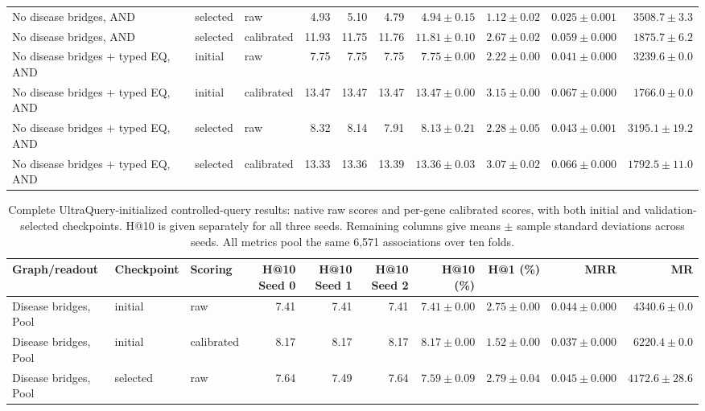 \begin{landscape}
\begin{table}[p]
\begin{adjustbox}{max width=\linewidth}
\begin{tabular}{lllrrrrrrr}
No disease bridges, AND & selected & raw & 4.93 & 5.10 & 4.79 & $4.94\pm 0.15$ & $1.12\pm 0.02$ & $0.025\pm 0.001$ & $3508.7\pm 3.3$ \\
No disease bridges, AND & selected & calibrated & 11.93 & 11.75 & 11.76 & $11.81\pm 0.10$ & $2.67\pm 0.02$ & $0.059\pm 0.000$ & $1875.7\pm 6.2$ \\
No disease bridges + typed EQ, AND & initial & raw & 7.75 & 7.75 & 7.75 & $7.75\pm 0.00$ & $2.22\pm 0.00$ & $0.041\pm 0.000$ & $3239.6\pm 0.0$ \\
No disease bridges + typed EQ, AND & initial & calibrated & 13.47 & 13.47 & 13.47 & $13.47\pm 0.00$ & $3.15\pm 0.00$ & $0.067\pm 0.000$ & $1766.0\pm 0.0$ \\
No disease bridges + typed EQ, AND & selected & raw & 8.32 & 8.14 & 7.91 & $8.13\pm 0.21$ & $2.28\pm 0.05$ & $0.043\pm 0.001$ & $3195.1\pm 19.2$ \\
No disease bridges + typed EQ, AND & selected & calibrated & 13.33 & 13.36 & 13.39 & $13.36\pm 0.03$ & $3.07\pm 0.02$ & $0.066\pm 0.000$ & $1792.5\pm 11.0$ \\
\bottomrule
\end{tabular}
\end{adjustbox}
\end{table}
\clearpage
\begin{table}[p]
\centering\footnotesize
\setlength{\tabcolsep}{3pt}
\caption{Complete UltraQuery-initialized controlled-query results: native raw scores and per-gene calibrated scores, with both initial and validation-selected checkpoints. H@10 is given separately for all three seeds. Remaining columns give means $\pm$ sample standard deviations across seeds. All metrics pool the same 6,571 associations over ten folds.}
\label{tab:controlled_query_full_ultraquery}
\begin{adjustbox}{max width=\linewidth}
\begin{tabular}{lllrrrrrrr}
\toprule
Graph/readout & Checkpoint & Scoring & H@10 Seed 0 & H@10 Seed 1 & H@10 Seed 2 & H@10 (\%) & H@1 (\%) & MRR & MR \\
\midrule
Disease bridges, Pool & initial & raw & 7.41 & 7.41 & 7.41 & $7.41\pm 0.00$ & $2.75\pm 0.00$ & $0.044\pm 0.000$ & $4340.6\pm 0.0$ \\
Disease bridges, Pool & initial & calibrated & 8.17 & 8.17 & 8.17 & $8.17\pm 0.00$ & $1.52\pm 0.00$ & $0.037\pm 0.000$ & $6220.4\pm 0.0$ \\
Disease bridges, Pool & selected & raw & 7.64 & 7.49 & 7.64 & $7.59\pm 0.09$ & $2.79\pm 0.04$ & $0.045\pm 0.000$ & $4172.6\pm 28.6$ \\

\end{tabular}
\end{adjustbox}
\end{table}
\end{landscape}
